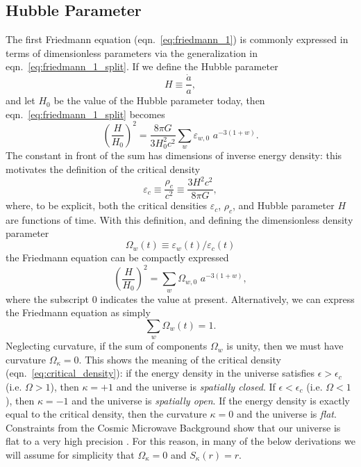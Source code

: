 \subsection{Hubble Parameter}
\label{sec:hubble_parameter}
The first Friedmann equation (eqn.~\ref{eq:friedmann_1}) is commonly expressed
in terms of dimensionless parameters via the generalization in
eqn.~\ref{eq:friedmann_1_split}.  If we define the Hubble parameter
\begin{equation}
  \label{eq:hubble_parameter}
  H \equiv \frac{\dot{a}}{a},
\end{equation}
and let $H_0$ be the value of the Hubble parameter today, then
eqn.~\ref{eq:friedmann_1_split} becomes
\begin{equation}
  \left(\frac{H}{H_0}\right)^2 = \frac{8\pi G}{3H_0^2c^2}
  \sum_w \varepsilon_{w, 0} \,\, a^{-3(1 + w)}.
\end{equation}
The constant in front of the sum has dimensions of inverse energy density:
this motivates the definition of the critical density
\begin{equation}
  \label{eq:critical_density}
  \varepsilon_c \equiv \frac{\rho_c}{c^2} \equiv \frac{3 H^2 c^2}{8\pi G},
\end{equation}
where, to be explicit, both the critical densities $\varepsilon_c$,
$\rho_c$,
and Hubble parameter $H$ are functions of time.
With this definition, and defining the dimensionless density parameter
\begin{equation}
  \label{eq:density_parameter}
  \Omega_w(t) \equiv \varepsilon_w(t) / \varepsilon_c(t)
\end{equation}
the Friedmann equation can be compactly expressed
\begin{equation}
  \left(\frac{H}{H_0}\right)^2
  = \sum_w \Omega_{w, 0}\,\, a^{-3(1 + w)},
\end{equation}
where the subscript $0$ indicates the value at present.
Alternatively, we can express the Friedmann equation as simply
\begin{equation}
  \sum_w \Omega_w(t) = 1.
\end{equation}
Neglecting curvature, if the sum of components $\Omega_w$ is unity, then
we must have curvature $\Omega_\kappa = 0$.  This shows the meaning of
the critical density (eqn.~\ref{eq:critical_density}): if the energy density
in the universe satisfies $\epsilon > \epsilon_c$ (i.e. $\Omega > 1$), then
$\kappa = +1$ and the universe is {\it spatially closed}.
If $\epsilon < \epsilon_c$ (i.e. $\Omega < 1$), then $\kappa = -1$ and
the universe is {\it spatially open}. If the energy density is
exactly equal to the critical density, then the curvature $\kappa = 0$
and the universe is {\it flat}.  Constraints from the Cosmic Microwave
Background show that our universe is flat to a very high precision
\citep{WMAP7}.  For this reason, in many of the below derivations we will
assume for simplicity that $\Omega_\kappa = 0$ and $S_\kappa(r) = r$.


